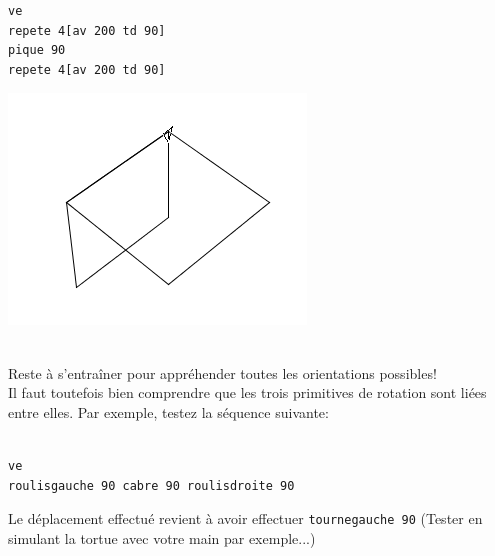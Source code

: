 \begin{minipage}{7cm}
\begin{verbatim}
ve
repete 4[av 200 td 90]
pique 90
repete 4[av 200 td 90]
\end{verbatim}
\end{minipage}
\begin{minipage}{10cm}
 \begin{center}
\includegraphics*[scale=0.4]{images/perspective1.png}
\end{center}
\end{minipage}
\\
Reste à s'entraîner pour appréhender toutes les orientations possibles!\\
Il faut toutefois bien comprendre que les trois primitives de rotation sont liées entre elles. Par exemple, testez la séquence suivante:\\ \\
\begin{minipage}{7cm}
\begin{verbatim}
ve
roulisgauche 90 cabre 90 roulisdroite 90
\end{verbatim}
\end{minipage}
\hspace{3cm}
\begin{minipage}{7cm}
 \begin{center}
Le déplacement effectué revient à avoir effectuer \texttt{tournegauche 90} (Tester en simulant la tortue avec votre main par exemple...)
\end{center}
\end{minipage}
